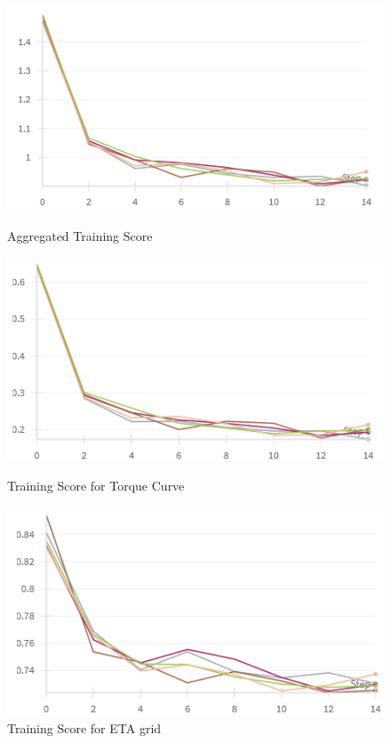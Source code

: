 \documentclass{report} %
\begin{document}
\begin{figure}[H]
    \centering
    \begin{minipage}[b]{0.3\textwidth}
        \includegraphics[width=\textwidth]{./ReportImages/train_score.png}
        \caption{\centering Aggregated Training Score}
        \label{fig:Aggregated Training Score}
    \end{minipage}
    \hfill
    \begin{minipage}[b]{0.3\textwidth}
        \includegraphics[width=\textwidth]{./ReportImages/train_score_y1.png}
        \caption{\centering Training Score for Torque Curve}
        \label{fig:Training Score for Torque Curve}
    \end{minipage}
    \hfill
    \begin{minipage}[b]{0.3\textwidth}
        \includegraphics[width=\textwidth]{./ReportImages/train_score_y2.png}
        \caption{\centering Training Score for ETA grid}
        \label{fig:Training Score for ETA grid}
    \end{minipage}
\end{figure}
\end{document}
